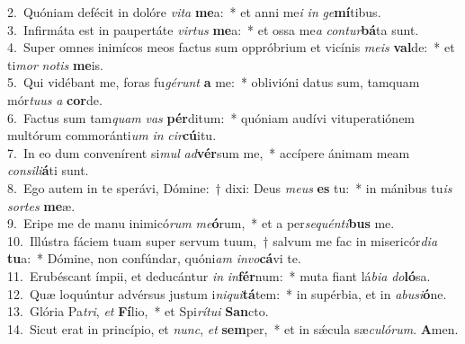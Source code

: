 {2.~}Quóniam defécit in dolóre \textit{vi}\textit{ta} \textbf{me}a:~* et anni me\textit{i} \textit{in} \textit{ge}\textbf{mí}tibus.\\
{3.~}Infirmáta est in paupertáte \textit{vir}\textit{tus} \textbf{me}a:~* et ossa me\textit{a} \textit{con}\textit{tur}\textbf{bá}ta sunt.\\
{4.~}Super omnes inimícos meos factus sum oppróbrium et vicínis \textit{me}\textit{is} \textbf{val}de:~* et ti\textit{mor} \textit{no}\textit{tis} \textbf{me}is.\\
{5.~}Qui vidébant me, foras fu\textit{gé}\textit{runt} \textbf{a} me:~* oblivióni datus sum, tamquam mór\textit{tu}\textit{us} \textit{a} \textbf{cor}de.\\
{6.~}Factus sum tam\textit{quam} \textit{vas} \textbf{pér}ditum:~* quóniam audívi vituperatiónem multórum commoránti\textit{um} \textit{in} \textit{cir}\textbf{cú}itu.\\
{7.~}In eo dum convenírent si\textit{mul} \textit{ad}\textbf{vér}sum me,~* accípere ánimam meam \textit{con}\textit{si}\textit{li}\textbf{á}ti sunt.\\
{8.~}Ego autem in te sperávi, Dómine:~† dixi: Deus \textit{me}\textit{us} \textbf{es} tu:~* in mánibus tu\textit{is} \textit{sor}\textit{tes} \textbf{me}æ.\\
{9.~}Eripe me de manu inimicó\textit{rum} \textit{me}\textbf{ó}rum,~* et a per\textit{se}\textit{quén}\textit{ti}\textbf{bus} me.\\
{10.~}Illústra fáciem tuam super servum tuum,~† salvum me fac in misericór\textit{di}\textit{a} \textbf{tu}a:~* Dómine, non confúndar, quóni\textit{am} \textit{in}\textit{vo}\textbf{cá}vi te.\\
{11.~}Erubéscant ímpii, et deducántur \textit{in} \textit{in}\textbf{fér}num:~* muta fiant lá\textit{bi}\textit{a} \textit{do}\textbf{ló}sa.\\
{12.~}Quæ loquúntur advérsus justum i\textit{ni}\textit{qui}\textbf{tá}tem:~* in supérbia, et in \textit{a}\textit{bu}\textit{si}\textbf{ó}ne.\\
{13.~}Glória Pa\textit{tri}, \textit{et} \textbf{Fí}lio,~* et Spi\textit{rí}\textit{tu}\textit{i} \textbf{San}cto.\\
{14.~}Sicut erat in princípio, et \textit{nunc}, \textit{et} \textbf{sem}per,~* et in sǽcula sæ\textit{cu}\textit{ló}\textit{rum}. \textbf{A}men.\\
